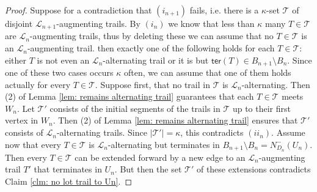 \documentclass[10pt,a4paper]{amsart}
\begin{document}
\begin{proof}
 Suppose for a contradiction that $ (i_{n+1}) $ fails, i.e. there is a $ \kappa $-set $ \mathcal{T} $ of disjoint $ 
 \mathcal{L}_{n+1} 
 $-augmenting trails. By $( i_n) $ we know that less than $ \kappa $ many $ T\in \mathcal{T} $ are $ \mathcal{L}_n 
 $-augmenting trails, thus by 
 deleting these we can assume that no $ T\in \mathcal{T} $ is an $ \mathcal{L}_n $-augmenting trail. then exactly one of the following holds for 
 each
  $ T\in \mathcal{T} $: either $ T $ is not even an $ \mathcal{L}_n $-alternating trail or it is but $ 
 \mathsf{ter}(T)\in B_{n+1}\setminus B_n $. Since one of these two cases occurs $ \kappa $ often, we can assume that one of them holds 
 actually for every $ T\in \mathcal{T} $. Suppose first, that no trail in $ \mathcal{T} $ is $ \mathcal{L}_n $-alternating. 
 Then  (2) of Lemma 
 \ref{lem: remains alternating trail}   guarantees that each $ 
 T\in \mathcal{T} $ meets $ W_n $. Let $ \mathcal{T}' $ consists of the initial segments of the trails in $ \mathcal{T} $ up to their first vertex in $ 
 W_n $. Then (2) 
 of Lemma \ref{lem: remains alternating trail} ensures that $ 
 \mathcal{T}' 
 $ consists of $ \mathcal{L}_n $-alternating trails. Since $ \left|\mathcal{T}'\right|=\kappa $, this contradicts $ (ii_n) $. Assume now that every 
 $ T\in \mathcal{T} $ is $ \mathcal{L}_n $-alternating but terminates in $ B_{n+1}\setminus B_n= N_{D_n}^{-}(U_n) $. Then 
 every $ T\in 
 \mathcal{T} $ can be extended forward by a new edge to  an $ \mathcal{L}_n $-augmenting trail $ T' $ that terminates in $ 
 U_n $. But then the set 
 $ \mathcal{T}' $  of these extensions contradicts Claim \ref{clm: no lot trail to Un}.
\end{proof}
\end{document}
